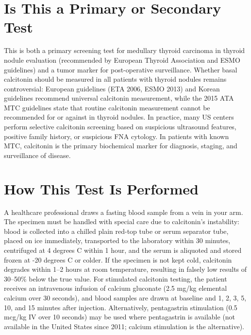\section*{Is This a Primary or Secondary Test}
This is both a primary screening test for medullary thyroid carcinoma in thyroid nodule evaluation (recommended by European Thyroid Association and ESMO guidelines) and a tumor marker for post-operative surveillance. Whether basal calcitonin should be measured in all patients with thyroid nodules remains controversial: European guidelines (ETA 2006, ESMO 2013) and Korean guidelines recommend universal calcitonin measurement, while the 2015 ATA MTC guidelines state that routine calcitonin measurement cannot be recommended for or against in thyroid nodules. In practice, many US centers perform selective calcitonin screening based on suspicious ultrasound features, positive family history, or suspicious FNA cytology. In patients with known MTC, calcitonin is the primary biochemical marker for diagnosis, staging, and surveillance of disease.

\section*{How This Test Is Performed}
A healthcare professional draws a fasting blood sample from a vein in your arm. The specimen must be handled with special care due to calcitonin's instability: blood is collected into a chilled plain red-top tube or serum separator tube, placed on ice immediately, transported to the laboratory within 30 minutes, centrifuged at 4 degrees C within 1 hour, and the serum is aliquoted and stored frozen at -20 degrees C or colder. If the specimen is not kept cold, calcitonin degrades within 1--2 hours at room temperature, resulting in falsely low results of 30--50\% below the true value. For stimulated calcitonin testing, the patient receives an intravenous infusion of calcium gluconate (2.5 mg/kg elemental calcium over 30 seconds), and blood samples are drawn at baseline and 1, 2, 3, 5, 10, and 15 minutes after injection. Alternatively, pentagastrin stimulation (0.5 mcg/kg IV over 10 seconds) may be used where pentagastrin is available (not available in the United States since 2011; calcium stimulation is the alternative).

